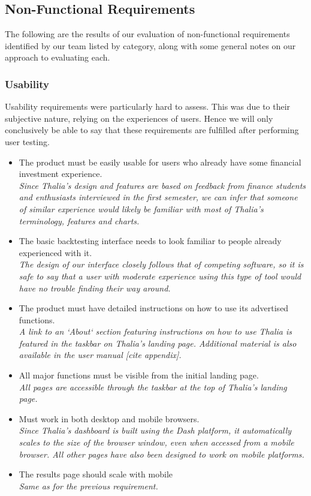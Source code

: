\documentclass[main.tex]{subfiles}
\begin{document}
\subsection{Non-Functional Requirements}
The following are the results of our evaluation of non-functional requirements identified by our team listed by category, along with some general notes on our approach to evaluating each.

\subsubsection{Usability}
Usability requirements were particularly hard to assess. This was due to their subjective nature, relying on the experiences of users. Hence we will only conclusively be able to say that these requirements are fulfilled after performing user testing.

\begin{itemize}

\item The product must be easily usable for users who already have some ﬁnancial investment experience.\\
\textit{Since Thalia’s design and features are based on feedback from finance students and enthusiasts interviewed in the first semester, we can infer that someone of similar experience would likely be familiar with most of Thalia's terminology, features and charts.}
\item The basic backtesting interface needs to look familiar to people already experienced with it. \\
\textit{The design of our interface closely follows that of competing software, so it is safe to say that a user with moderate experience using this type of tool would have no trouble finding their way around.}

\item The product must have detailed instructions on how to use its advertised functions.\\
\textit{A link to an `About` section featuring instructions on how to use Thalia is featured in the taskbar on Thalia’s landing page. Additional material is also available in the user manual [cite appendix].} 
\item All major functions must be visible from the initial landing page.\\
\textit{All pages are accessible through the taskbar at the top of Thalia’s landing page.}
\item Must work in both desktop and mobile browsers.\\
\textit{Since Thalia’s dashboard is built using the Dash platform, it automatically scales to the size of the browser window, even when accessed from a mobile browser. All other pages have also been designed to work on mobile platforms.}
\item The results page should scale with mobile\\
\textit{Same as for the previous requirement.}

\end{itemize}
\end{document}
